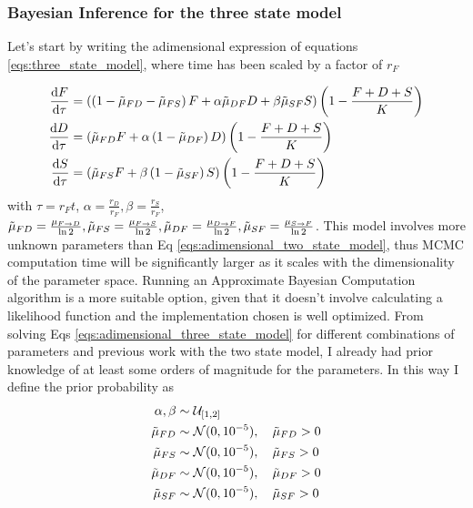 \documentclass[10pt,a4paper]{scrartcl}
\begin{document}


\subsubsection{Bayesian Inference for the three state model}
Let's start by writing the adimensional expression of equations \ref{eqs:three_state_model}, where time has been scaled by a factor of $r_F$

\begin{subequations}\label{eqs:adimensional_three_state_model}
\begin{align}
\dv{F}{\tau} &= \left( \left(1 - \Tilde{\mu}_{FD} - \Tilde{\mu}_{FS}\right)F + \alpha \Tilde{\mu}_{DF} D + \beta \Tilde{\mu}_{SF} S \right)\left(1-\frac{F + D + S}{K}\right)\\
\dv{D}{\tau} &=\left(  \Tilde{\mu}_{FD}F + \alpha\left(1 -\Tilde{\mu}_{DF}\right)D \right) \left(1-\frac{F + D + S}{K}\right) \\
\dv{S}{\tau} &= \left( \Tilde{\mu}_{FS}F + \beta\left(1 - \Tilde{\mu}_{SF}\right)S \right) \left(1-\frac{F + D + S}{K}\right) 
\end{align}
\end{subequations}
with $\tau = r_F t$, $\alpha = \frac{r_D}{r_F}, \beta = \frac{r_S}{r_F}$, $\Tilde{\mu}_{FD} = \frac{\mu_{F\rightarrow D}}{\ln{2}}, \Tilde{\mu}_{FS} = \frac{\mu_{F\rightarrow S}}{\ln{2}}, \Tilde{\mu}_{DF} = \frac{\mu_{D\rightarrow F}}{\ln{2}}, \Tilde{\mu}_{SF} = \frac{\mu_{S\rightarrow F}}{\ln{2}}$.
This model involves more unknown parameters than Eq \ref{eqs:adimensional_two_state_model}, thus MCMC computation time will be significantly larger as it scales with the dimensionality of the parameter space. Running an Approximate Bayesian Computation algorithm is a more suitable option, given that it doesn't involve calculating a likelihood function and the implementation chosen is well optimized. From solving Eqs \ref{eqs:adimensional_three_state_model} for different combinations of parameters and previous work with the two state model, I already had prior knowledge of at least some orders of magnitude for the parameters. In this way I define the prior probability as
\begin{subequations}
    \begin{align*}
        \alpha, \beta &\sim \mathcal{U}_{[1,2]}\\
        \Tilde{\mu}_{FD} &\sim \mathcal{N}(0,10^{-5}), \quad \Tilde{\mu}_{FD}>0 \\
        \Tilde{\mu}_{FS} &\sim \mathcal{N}(0,10^{-5}), \quad \Tilde{\mu}_{FS}>0 \\
        \Tilde{\mu}_{DF} &\sim \mathcal{N}(0,10^{-5}), \quad \Tilde{\mu}_{DF}>0 \\
        \Tilde{\mu}_{SF} &\sim \mathcal{N}(0,10^{-5}), \quad \Tilde{\mu}_{SF}>0 
    \end{align*}
\end{subequations}
\end{document}

